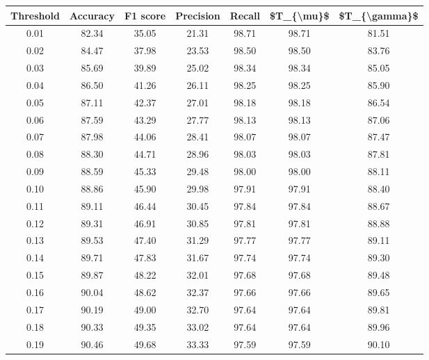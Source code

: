 \begin{tabular}{|c|c|c|c|c|c|c|}
\hline
 Threshold &  Accuracy &  F1 score &  Precision &  Recall &  \$T\_\{\textbackslash mu\}\$ &  \$T\_\{\textbackslash gamma\}\$ \\
\hline
      0.01 &     82.34 &     35.05 &      21.31 &   98.71 &      98.71 &         81.51 \\
      0.02 &     84.47 &     37.98 &      23.53 &   98.50 &      98.50 &         83.76 \\
      0.03 &     85.69 &     39.89 &      25.02 &   98.34 &      98.34 &         85.05 \\
      0.04 &     86.50 &     41.26 &      26.11 &   98.25 &      98.25 &         85.90 \\
      0.05 &     87.11 &     42.37 &      27.01 &   98.18 &      98.18 &         86.54 \\
      0.06 &     87.59 &     43.29 &      27.77 &   98.13 &      98.13 &         87.06 \\
      0.07 &     87.98 &     44.06 &      28.41 &   98.07 &      98.07 &         87.47 \\
      0.08 &     88.30 &     44.71 &      28.96 &   98.03 &      98.03 &         87.81 \\
      0.09 &     88.59 &     45.33 &      29.48 &   98.00 &      98.00 &         88.11 \\
      0.10 &     88.86 &     45.90 &      29.98 &   97.91 &      97.91 &         88.40 \\
      0.11 &     89.11 &     46.44 &      30.45 &   97.84 &      97.84 &         88.67 \\
      0.12 &     89.31 &     46.91 &      30.85 &   97.81 &      97.81 &         88.88 \\
      0.13 &     89.53 &     47.40 &      31.29 &   97.77 &      97.77 &         89.11 \\
      0.14 &     89.71 &     47.83 &      31.67 &   97.74 &      97.74 &         89.30 \\
      0.15 &     89.87 &     48.22 &      32.01 &   97.68 &      97.68 &         89.48 \\
      0.16 &     90.04 &     48.62 &      32.37 &   97.66 &      97.66 &         89.65 \\
      0.17 &     90.19 &     49.00 &      32.70 &   97.64 &      97.64 &         89.81 \\
      0.18 &     90.33 &     49.35 &      33.02 &   97.64 &      97.64 &         89.96 \\
      0.19 &     90.46 &     49.68 &      33.33 &   97.59 &      97.59 &         90.10 \\

\end{tabular}
